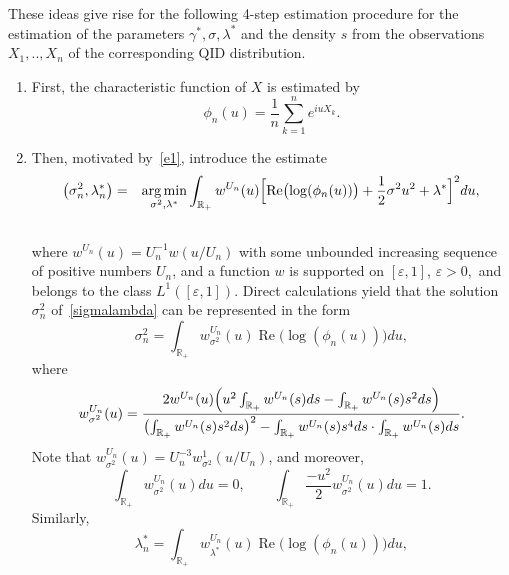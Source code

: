 \documentclass[a4paper,11pt]{article}
\theoremstyle{definition}
\newcommand{\R}{{\mathbb{R}}}
\newcommand{\1}{\mathbb{I}}
\def\R{\mathbb{R}}
\newcommand{\eps}{\varepsilon}
\newcommand{\argmin}{\operatornamewithlimits{arg\,min}}
\renewcommand{\Re}{\operatorname{Re}}
\theoremstyle{remark}
\begin{document}
These ideas give rise for the following 4-step estimation procedure for the estimation of the parameters \(\gamma^*,\sigma, \lambda^* \) and the density \(s\) from the observations \(X_1,..,X_n\) of the corresponding QID distribution. 
\begin{enumerate}
  \item First, the characteristic function of \(X\) is estimated by \begin{equation}\label{em_char_func}
      \phi_n(u) = \frac{1}{n}\sum_{k=1}^{n} e^{iuX_k}.
  \end{equation}
  \item Then, motivated by~\eqref{e1},  introduce the estimate  
  \begin{eqnarray}\nonumber
\bigl( \sigma_n^2, \lambda^*_n\bigr) &=& \argmin_{\sigma^2, \lambda^* } \int_{\R_+} w^{U_n}(u) 
\Bigl[
\Re\bigl(\log(\phi_n(u)) \bigr) 
+\frac{1}{2} \sigma^2 u^2  +\lambda^* 
\Bigr]^2 du,\\
&&\label{sigmalambda}
\end{eqnarray}
where \(w^{U_n}(u)=U_n^{-1} w(u/U_n)\) with some unbounded increasing sequence of positive numbers \(U_n\), and a function \(w\) is supported on \([\eps,1]\), \(\eps>0,\) and belongs to the class \(L^1([\eps,1] )\). Direct calculations yield that the solution $\sigma^2_n$ of~\eqref{sigmalambda} can be represented in the form
\begin{equation}\label{sigma_sol}
    \sigma^2_n = \int_{\R_+}w^{U_n}_{\sigma^2}(u) \Re\bigl(\log(\phi_n(u)) \bigr)du,
\end{equation}
where
\begin{equation*}
    w^{U_n}_{\sigma^2}(u) = \frac{2 w^{U_n}(u) \Bigl( u^2\int_{\R_+} w^{U_n}(s) ds - \int_{\R_+} w^{U_n}(s) s^2 ds\Bigr)}{\bigl(\int_{\R_+} w^{U_n}(s) s^2 ds\bigr)^2 - \int_{\R_+} w^{U_n}(s) s^4ds \cdot \int_{\R_+} w^{U_n}(s) ds}.
\end{equation*}
Note that $w^{U_n}_{\sigma^2}(u)=U_n^{-3}w^{1}_{\sigma^2}(u/U_n)$, and moreover,
\begin{equation}\label{prop1}
    \int_{\R_+} w^{U_n}_{\sigma^2}(u) du = 0, \qquad \int_{\R_+} \frac{-u^2}{2} w^{U_n}_{\sigma^2}(u) du = 1.
\end{equation}
Similarly,
\begin{equation}\label{lambda_sol}
    \lambda^*_n = \int_{\R_+}w^{U_n}_{\lambda^*}(u) \Re\bigl(\log(\phi_n(u)) \bigr)du,

\end{equation}
\end{enumerate}
\end{document}

